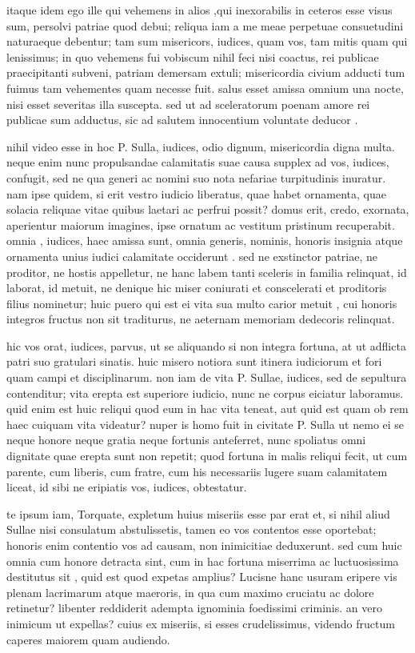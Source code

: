  itaque idem ego ille qui vehemens in alios ,qui inexorabilis in ceteros esse visus sum, persolvi patriae quod debui; reliqua iam a me meae perpetuae consuetudini naturaeque debentur; tam sum misericors, iudices, quam vos, tam mitis quam qui lenissimus; in quo vehemens fui vobiscum nihil feci nisi coactus, rei publicae praecipitanti subveni, patriam demersam extuli; misericordia civium adducti tum fuimus tam vehementes quam necesse fuit. salus esset amissa omnium una nocte, nisi esset severitas illa suscepta. sed ut ad sceleratorum poenam amore rei publicae sum adductus, sic ad salutem innocentium voluntate deducor .

 nihil video esse in hoc P. Sulla, iudices, odio dignum, misericordia digna multa. neque enim nunc propulsandae calamitatis suae causa supplex ad vos, iudices, confugit, sed ne qua generi ac nomini suo nota nefariae turpitudinis inuratur. nam ipse quidem, si erit vestro iudicio liberatus, quae habet ornamenta, quae solacia reliquae vitae quibus laetari ac perfrui possit? domus erit, credo, exornata, aperientur maiorum imagines, ipse ornatum ac vestitum pristinum recuperabit. omnia , iudices, haec amissa sunt, omnia generis, nominis, honoris insignia atque ornamenta unius iudici calamitate occiderunt . sed ne exstinctor patriae, ne proditor, ne hostis appelletur, ne hanc labem tanti sceleris in familia relinquat, id laborat, id metuit, ne denique hic miser coniurati et conscelerati et proditoris filius nominetur; huic puero qui est ei vita sua multo carior metuit , cui honoris integros fructus non sit traditurus, ne aeternam memoriam dedecoris relinquat.

 hic vos orat, iudices, parvus, ut se aliquando si non integra fortuna, at ut adflicta patri suo gratulari sinatis. huic misero notiora sunt itinera iudiciorum et fori quam campi et disciplinarum. non iam de vita P. Sullae, iudices, sed de sepultura contenditur; vita erepta est superiore iudicio, nunc ne corpus eiciatur laboramus. quid enim est huic reliqui quod eum in hac vita teneat, aut quid est quam ob rem haec cuiquam vita videatur? nuper is homo fuit in civitate P. Sulla ut nemo ei se neque honore neque gratia neque fortunis anteferret, nunc spoliatus omni dignitate quae erepta sunt non repetit; quod fortuna in malis reliqui fecit, ut cum parente, cum liberis, cum fratre, cum his necessariis lugere suam calamitatem liceat, id sibi ne eripiatis vos, iudices, obtestatur.

 te ipsum iam, Torquate, expletum huius miseriis esse par erat et, si nihil aliud Sullae nisi consulatum abstulissetis, tamen eo vos contentos esse oportebat; honoris enim contentio vos ad causam, non inimicitiae deduxerunt. sed cum huic omnia cum honore detracta sint, cum in hac fortuna miserrima ac luctuosissima destitutus sit , quid est quod expetas amplius? Lucisne hanc usuram eripere vis plenam lacrimarum atque maeroris, in qua cum maximo cruciatu ac dolore retinetur? libenter reddiderit adempta ignominia foedissimi criminis. an vero inimicum ut expellas? cuius ex miseriis, si esses crudelissimus, videndo fructum caperes maiorem quam audiendo.


